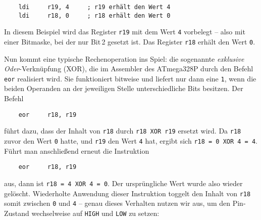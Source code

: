\documentclass[a4paper,12pt]{article}
\begin{document}
\begin{lstlisting}
    ldi     r19, 4     ; r19 erhält den Wert 4
    ldi     r18, 0     ; r18 erhält den Wert 0
\end{lstlisting}

\noindent
In diesem Beispiel wird das Register \texttt{r19} mit dem Wert \texttt{4}
vorbelegt – also mit einer Bitmaske, bei der nur Bit 2 gesetzt ist. Das Register
\texttt{r18} erhält den Wert \texttt{0}.

Nun kommt eine typische Rechenoperation ins Spiel: die sogenannte
\emph{exklusive Oder}-Verknüpfung (XOR), die im Assembler des ATmega328P durch
den Befehl \texttt{eor} realisiert wird. Sie funktioniert bitweise und liefert
nur dann eine \texttt{1}, wenn die beiden Operanden an der jeweiligen Stelle
unterschiedliche Bits besitzen. Der Befehl

\begin{lstlisting}
    eor     r18, r19
\end{lstlisting}

\noindent
führt dazu, dass der Inhalt von \texttt{r18} durch \texttt{r18 XOR r19}
ersetzt wird. Da \texttt{r18} zuvor den Wert \texttt{0} hatte, und \texttt{r19}
den Wert \texttt{4} hat, ergibt sich \texttt{r18 = 0 XOR 4 = 4}.
Führt man anschließend erneut die Instruktion

\begin{lstlisting}
    eor     r18, r19
\end{lstlisting}

\noindent
aus, dann ist \texttt{r18 = 4 XOR 4 = 0}. Der ursprüngliche Wert wurde also
wieder gelöscht. Wiederholte Anwendung dieser Instruktion toggelt den Inhalt von
\texttt{r18} somit zwischen \texttt{0} und \texttt{4} – genau dieses Verhalten
nutzen wir aus, um den Pin-Zustand wechselweise auf \texttt{HIGH} und
\texttt{LOW} zu setzen:

\begin{center}
\begin{minipage}{0.42\textwidth}
\end{minipage}
\hfill
\begin{minipage}{0.42\textwidth}
\end{minipage}
\end{center}
\end{document}
